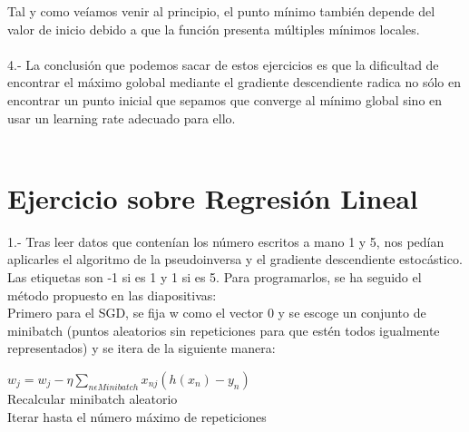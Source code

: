 \documentclass[12pt]{article}
\begin{document}
Tal y como veíamos venir al principio, el punto mínimo también depende del valor de inicio debido a que la función presenta múltiples mínimos locales.
\\\\
4.- La conclusión que podemos sacar de estos ejercicios es que la dificultad de encontrar el máximo golobal mediante el gradiente descendiente radica no sólo en encontrar un punto inicial que sepamos que converge al mínimo global sino en usar un learning rate adecuado para ello.
\\\\
\section{Ejercicio sobre Regresión Lineal}
1.- Tras leer datos que contenían los número escritos a mano 1 y 5, nos pedían aplicarles el algoritmo de la pseudoinversa y el gradiente descendiente estocástico. Las etiquetas son -1 si es 1 y 1 si es 5. Para programarlos, se ha seguido el método propuesto en las diapositivas: \\
Primero para el SGD, se fija w como el vector 0 y se escoge un conjunto de minibatch (puntos aleatorios sin repeticiones para que estén todos igualmente representados) y se itera de la siguiente manera:
\begin{center}
$w_{j} = w_{j} - \eta \sum_{n \epsilon Minibatch}x_{nj}(h(x_{n}) - y_{n}) $ \\
Recalcular minibatch aleatorio \\
Iterar hasta el número máximo de repeticiones \\
\end{center}
\end{document}
